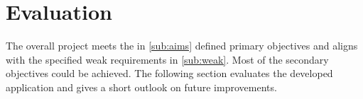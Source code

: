 \section{Evaluation}
\label{sec:evaluation}

The overall project meets the in \autoref{sub:aims} defined primary objectives and aligns with the specified weak requirements in \autoref{sub:weak}. Most of the secondary objectives could be achieved. The following section evaluates the developed application and gives a short outlook on future improvements. 


